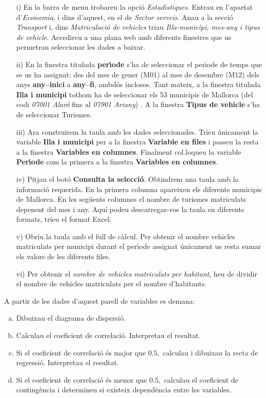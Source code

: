 \documentclass[11pt]{article}
\begin{document}
\begin{itemize}
\item [i)] En la barra de menu trobareu la opci\'o \textit{Estad\'{\i}stiques}. Entrau en l'apartat d'\textit{Economia}, i dins d'aquest, en el de \textit{Sector serveis}. 
Anau a la secci\'o \textit{Transport} i, dins \textit{Matriculaci\'o de vehicles} triau 
\textit{Illa-municipi, mes-any i tipus de vehicle}. 
Accedireu a una plana web amb diferents finestres que us permetran seleccionar les dades a baixar.
\item [ii)] En la finestra titulada \textbf{per\'{\i}ode} s'ha de seleccionar el per\'{\i}ode de temps que se us ha assignat: des del mes de gener (M01) al mes de desembre (M12) dels anys \textbf{any--inici}  a \textbf{any--fi}, ambd\'os inclosos. Tant mateix, a la finestra titulada \textbf{Illa i municipi} tothom ha de seleccionar els 53 municipis de Mallorca (del codi \textit{07001 Alar\'o} fins al \textit{07901 Ariany}) . A la finestra \textbf{Tipus de vehicle} s'ha de seleccionar Turismes.
\item [iii)] Ara construirem la taula amb les dades seleccionades. Trieu \'unicament la variable \textbf{Illa i municipi} per a la finestra \textbf{Variable en files} i passeu la resta a la finestra \textbf{Variables en columnes}. Finalment col.loqueu la variable \textbf{Per\'{\i}ode} com la primera a la finestra \textbf{Variables en columnes}.
\item [iv)] Pitjau el bot\'o \textbf{Consulta la selecci\'o}. Obtindrem una taula amb la informaci\'o requerida. En la primera columna apareixen els diferents municipis de Mallorca. En les seg\"uents columnes el nombre de turismes matriculats depenent del mes i any. Aqu\'i podeu descarregar-vos la taula en diferents formats, trieu el format Excel.
\item [v)] Obriu la taula amb el full de c\`alcul. Per obtenir el nombre vehicles matriculats per municipi durant el per\'{\i}ode assignat \'unicament us resta sumar els valors de les diferents files. 
\item [vi)] Per obtenir el \textit{nombre de vehicles matriculats per habitant}, heu de dividir el nombre de vehicles matriculats per el nombre d'habitants.
\end{itemize}

A partir de les dades d'aquest parell de variables es demana:

\begin{enumerate}[a)]
\item Dibuixau el diagrama de dispersi\'o.
\item Calculau el coeficient de correlaci\'o. Interpretau el resultat.
\item Si el coeficient de correlaci\'o \'es major que $0.5,$ calculau i dibuixau la recta de regressi\'o. Interpretau el resultat.
\item Si el coeficient de correlaci\'o \'es menor que $0.5,$ calculau el coeficient de conting\`encia i determineu si existeix depend\`encia entre les variables.
\end{enumerate}
\end{document}
